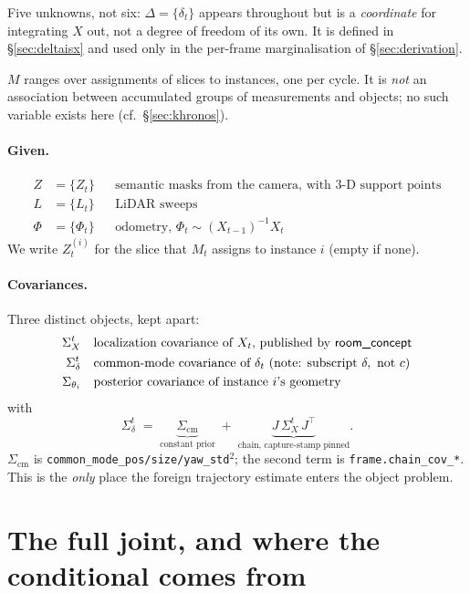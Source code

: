 \documentclass[11pt,a4paper]{report}
\theoremstyle{definition}   %
\begin{document}
\noindent
Five unknowns, not six: $\Delta=\{\delta_t\}$ appears throughout but is a \emph{coordinate} for
integrating $X$ out, not a degree of freedom of its own. It is defined in \S\ref{sec:deltaisx}
and used only in the per-frame marginalisation of \S\ref{sec:derivation}.

\noindent
$M$ ranges over assignments of slices to instances, one per cycle. It is \emph{not} an
association between accumulated groups of measurements and objects; no such variable exists here
(cf.\ \S\ref{sec:khronos}).

\paragraph{Given.}
\begin{align*}
Z &=\{Z_t\}       && \text{semantic masks from the camera, with 3-D support points}\\
L &=\{L_t\}       && \text{LiDAR sweeps}\\
\Phi &=\{\Phi_t\} && \text{odometry, } \Phi_t\sim (X_{t-1})^{-1}X_t
\end{align*}
We write $Z_t^{(i)}$ for the slice that $M_t$ assigns to instance $i$ (empty if none).

\paragraph{Covariances.} Three distinct objects, kept apart:
\begin{align*}
\Sigma_X^t  &&& \text{localization covariance of }X_t\text{, published by \textsf{room\_concept}}\\
\Sigma_\delta^t &&& \text{common-mode covariance of }\delta_t\ \text{(note: subscript }\delta,\ \text{not }c)\\
\Sigma_{\theta_i} &&& \text{posterior covariance of instance }i\text{'s geometry}
\end{align*}
with
\begin{equation}
\Sigma_\delta^t \;=\; \underbrace{\Sigma_{\mathrm{cm}}}_{\text{constant prior}}
\;+\; \underbrace{J\,\Sigma_X^t\,J^{\!\top}}_{\text{chain, capture-stamp pinned}} .
\label{eq:sigmadelta}
\end{equation}
$\Sigma_{\mathrm{cm}}$ is \texttt{common\_mode\_pos/size/yaw\_std}${}^2$; the second term is
\texttt{frame.chain\_cov\_*}. This is the \emph{only} place the foreign trajectory estimate
enters the object problem.

\section{The full joint, and where the conditional comes from}
\label{sec:joint}
\end{document}
